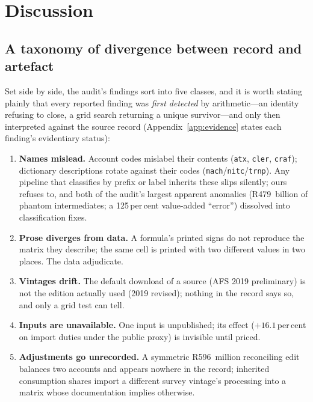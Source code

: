 \section{Discussion}\label{sec:discussion}

\subsection{A taxonomy of divergence between record and artefact}

Set side by side, the audit's findings sort into five classes, and it is
worth stating plainly that every reported finding was \emph{first
detected} by arithmetic---an identity refusing to close, a grid search
returning a unique survivor---and only then interpreted against the
source record (Appendix~\ref{app:evidence} states each finding's
evidentiary status):

\begin{enumerate}
  \item \textbf{Names mislead.} Account codes mislabel their contents
  (\texttt{atx}, \texttt{cler}, \texttt{craf}); dictionary descriptions
  rotate against their codes (\texttt{mach}/\texttt{nitc}/\texttt{trnp}).
  Any pipeline that classifies by prefix or label inherits these slips
  silently; ours refuses to, and both of the audit's largest apparent
  anomalies (R479~billion of phantom intermediates; a 125\,per\,cent
  value-added ``error'') dissolved into classification fixes.
  \item \textbf{Prose diverges from data.} A formula's printed signs do not
  reproduce the matrix they describe; the same cell is printed with two
  different values in two places. The data adjudicate.
  \item \textbf{Vintages drift.} The default download of a source (AFS 2019
  preliminary) is not the edition actually used (2019 revised); nothing in
  the record says so, and only a grid test can tell.
  \item \textbf{Inputs are unavailable.} One input is unpublished; its
  effect ($+16.1$\,per\,cent on import duties under the public proxy) is
  invisible until priced.
  \item \textbf{Adjustments go unrecorded.} A symmetric R596~million
  reconciling edit balances two accounts and appears nowhere in the record;
  inherited consumption shares import a different survey vintage's
  processing into a matrix whose documentation implies otherwise.
\end{enumerate}

